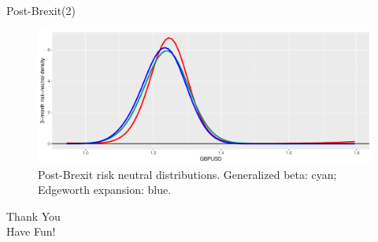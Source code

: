 \documentclass[ignorenonframetext,aspectratio=169]{beamer}
\begin{document}
\begin{frame}{Post-Brexit(2)}

\begin{figure}
\includegraphics[width=1\linewidth]{2018_02_07_IMF_FXCourse_files/figure-beamer/unnamed-chunk-82-1} \caption{Post-Brexit risk neutral distributions. Generalized beta: cyan; Edgeworth expansion: blue.}\label{fig:unnamed-chunk-82}
\end{figure}

\color{blue} \LARGE{Thank You}\\
\LARGE{Have Fun!}

\end{frame}
\end{document}
